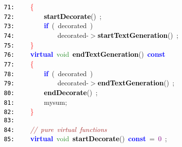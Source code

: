 \documentclass{article}
\begin{document}
\mbox{}\texttt{\textcolor{Black}{71:}} \ \ \ \ \textcolor{Red}{\{}\  \\
\mbox{}\texttt{\textcolor{Black}{72:}} \ \ \ \ \ \ \ \ \textbf{\textcolor{Black}{startDecorate}}\textcolor{BrickRed}{()}\ \textcolor{BrickRed}{;} \\
\mbox{}\texttt{\textcolor{Black}{73:}} \ \ \ \ \ \ \ \ \textbf{\textcolor{Blue}{if}}\ \textcolor{BrickRed}{(}\ decorated\ \textcolor{BrickRed}{)} \\
\mbox{}\texttt{\textcolor{Black}{74:}} \ \ \ \ \ \ \ \ \ \ \ \ decorated\textcolor{BrickRed}{-$>$}\textbf{\textcolor{Black}{startTextGeneration}}\textcolor{BrickRed}{()}\ \textcolor{BrickRed}{;} \\
\mbox{}\texttt{\textcolor{Black}{75:}} \ \ \ \ \textcolor{Red}{\}} \\
\mbox{}\texttt{\textcolor{Black}{76:}} \ \ \ \ \textbf{\textcolor{Blue}{virtual}}\ \textcolor{ForestGreen}{void}\ \textbf{\textcolor{Black}{\label{test.h:76}endTextGeneration}}\textcolor{BrickRed}{()}\ \textbf{\textcolor{Blue}{const}}\  \\
\mbox{}\texttt{\textcolor{Black}{77:}} \ \ \ \ \textcolor{Red}{\{}\  \\
\mbox{}\texttt{\textcolor{Black}{78:}} \ \ \ \ \ \ \ \ \textbf{\textcolor{Blue}{if}}\ \textcolor{BrickRed}{(}\ decorated\ \textcolor{BrickRed}{)} \\
\mbox{}\texttt{\textcolor{Black}{79:}} \ \ \ \ \ \ \ \ \ \ \ \ decorated\textcolor{BrickRed}{-$>$}\textbf{\textcolor{Black}{endTextGeneration}}\textcolor{BrickRed}{()}\ \textcolor{BrickRed}{;} \\
\mbox{}\texttt{\textcolor{Black}{80:}} \ \ \ \ \ \ \ \ \textbf{\textcolor{Black}{endDecorate}}\textcolor{BrickRed}{()}\ \textcolor{BrickRed}{;} \\
\mbox{}\texttt{\textcolor{Black}{81:}} \ \ \ \ \ \ \ \ mysum\textcolor{BrickRed}{;} \\
\mbox{}\texttt{\textcolor{Black}{82:}} \ \ \ \ \textcolor{Red}{\}} \\
\mbox{}\texttt{\textcolor{Black}{83:}}  \\
\mbox{}\texttt{\textcolor{Black}{84:}} \ \ \ \ \textit{\textcolor{Brown}{//\ pure\ virtual\ functions}} \\
\mbox{}\texttt{\textcolor{Black}{85:}} \ \ \ \ \textbf{\textcolor{Blue}{virtual}}\ \textcolor{ForestGreen}{void}\ \textbf{\textcolor{Black}{startDecorate}}\textcolor{BrickRed}{()}\ \textbf{\textcolor{Blue}{const}}\ \textcolor{BrickRed}{=}\ \textcolor{Purple}{0}\ \textcolor{BrickRed}{;} \\
\end{document}
